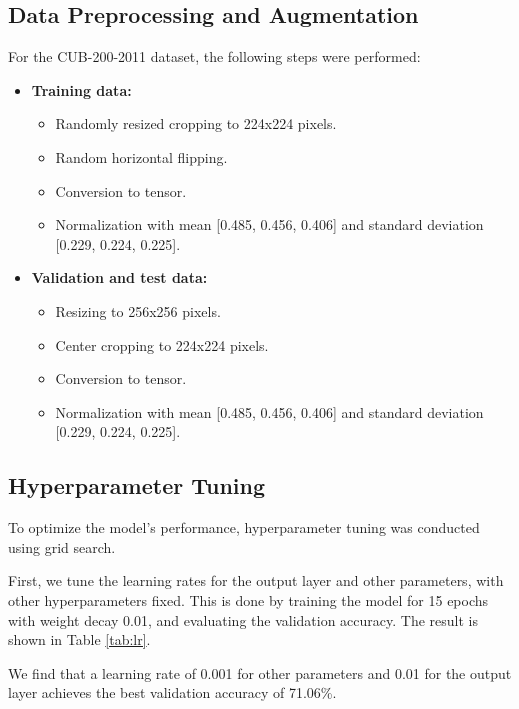 \documentclass[UTF8]{ctexart}
\begin{document}
\subsection{Data Preprocessing and Augmentation}
For the CUB-200-2011 dataset, the following steps were performed:
\begin{itemize}
    \item \textbf{Training data:}
    \begin{itemize}
        \item Randomly resized cropping to 224x224 pixels.
        \item Random horizontal flipping.
        \item Conversion to tensor.
        \item Normalization with mean [0.485, 0.456, 0.406] and standard deviation [0.229, 0.224, 0.225].
    \end{itemize}
    \item \textbf{Validation and test data:}
    \begin{itemize}
        \item Resizing to 256x256 pixels.
        \item Center cropping to 224x224 pixels.
        \item Conversion to tensor.
        \item Normalization with mean [0.485, 0.456, 0.406] and standard deviation [0.229, 0.224, 0.225].
    \end{itemize}
\end{itemize}

\subsection{Hyperparameter Tuning}
To optimize the model's performance, hyperparameter tuning was conducted using grid search.

First, we tune the learning rates for the output layer and other parameters, with other hyperparameters fixed.
This is done by training the model for 15 epochs with weight decay 0.01, and evaluating the validation accuracy.
The result is shown in Table \ref{tab:lr}.

We find that a learning rate of 0.001 for other parameters and 0.01 for the output layer achieves the best validation accuracy of 71.06\%.
\end{document}

